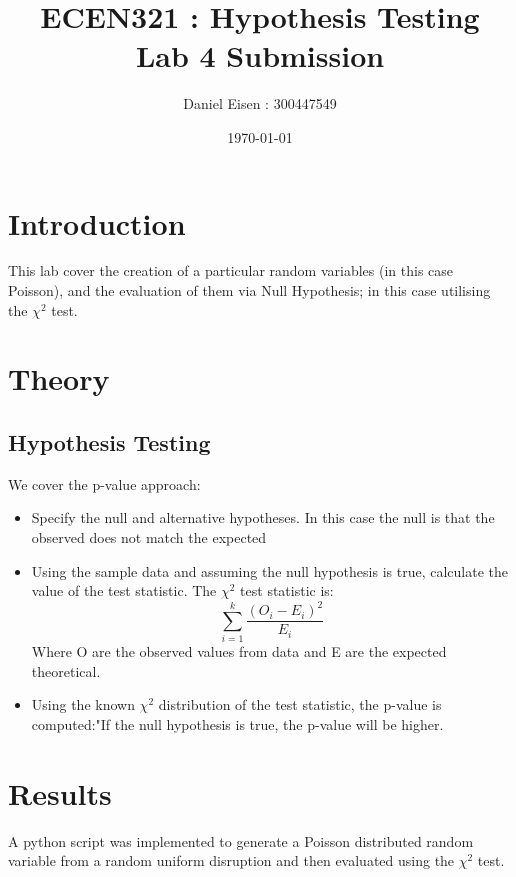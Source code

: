 \documentclass[11pt]{article}
\title{ECEN321 : Hypothesis Testing \\ Lab 4 Submission}
\author{Daniel Eisen : 300447549}
\date{\today}
\begin{document}
\begin{preview}
\maketitle
\section{Introduction}
This lab cover the creation of a particular random variables (in this case Poisson), and the evaluation of them via Null Hypothesis; in this case utilising the $\chi^2$ test.



\section{Theory}
\subsection*{Hypothesis Testing}
We cover the p-value approach:
\begin{itemize}
  \item Specify the null and alternative hypotheses. In this case the null is that the observed does not match the expected
  \item Using the sample data and assuming the null hypothesis is true, calculate the value of the test statistic. The $\chi^2$ test statistic is:
  $$ \sum^k_{i=1}\frac{(O_i - E_i)^2}{E_i}$$
  Where O are the observed values from data and E are the expected theoretical.
  \item Using the known $\chi^2$ distribution of the test statistic, the p-value is computed:"If the null hypothesis is true, the p-value will be higher.
\end{itemize}

\section{Results}
A python script was implemented to generate a Poisson distributed random variable from a random uniform disruption and then evaluated using the $\chi^2$ test.


\end{preview}
\end{document}
